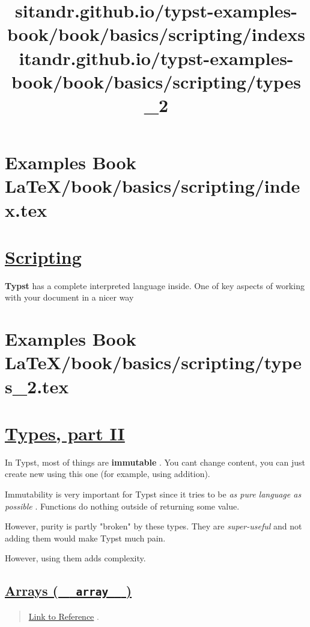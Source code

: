 \section{Examples Book LaTeX/book/basics/scripting/index.tex}
\title{sitandr.github.io/typst-examples-book/book/basics/scripting/index}

\section{\texorpdfstring{\hyperref[scripting]{Scripting}}{Scripting}}\label{scripting}

\textbf{Typst} has a complete interpreted language inside. One of key
aspects of working with your document in a nicer way


\section{Examples Book LaTeX/book/basics/scripting/types_2.tex}
\title{sitandr.github.io/typst-examples-book/book/basics/scripting/types_2}

\section{\texorpdfstring{\hyperref[types-part-ii]{Types, part
II}}{Types, part II}}\label{types-part-ii}

In Typst, most of things are \textbf{immutable} . You
can\textquotesingle t change content, you can just create new using this
one (for example, using addition).

Immutability is very important for Typst since it tries to be \emph{as
pure language as possible} . Functions do nothing outside of returning
some value.

However, purity is partly "broken" by these types. They are
\emph{super-useful} and not adding them would make Typst much pain.

However, using them adds complexity.

\subsection{\texorpdfstring{\hyperref[arrays-array]{Arrays (
\texttt{\ }{\texttt{\ array\ }}\texttt{\ }
)}}{Arrays (   array   )}}\label{arrays-array}

\begin{quote}
\href{https://typst.app/docs/reference/foundations/array/}{Link to
Reference} .
\end{quote}

